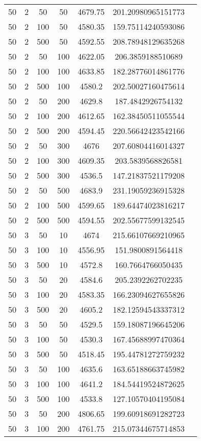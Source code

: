 {\begin{longtabu}{S
S
S
S
S
S[round-mode=places, round-precision=0]
S[round-mode=places, round-precision=0]}
50 & 2 & 50 & 50 & 4679.75 & 201.20980965151773 \\
50 & 2 & 100 & 50 & 4580.35 & 159.75114240593086 \\
50 & 2 & 500 & 50 & 4592.55 & 208.78948129635268 \\
50 & 2 & 50 & 100 & 4622.05 & 206.3859188510689 \\
50 & 2 & 100 & 100 & 4633.85 & 182.28776014861776 \\
50 & 2 & 500 & 100 & 4580.2 & 202.50027160475614 \\
50 & 2 & 50 & 200 & 4629.8 & 187.4842926754132 \\
50 & 2 & 100 & 200 & 4612.65 & 162.38450511055544 \\
50 & 2 & 500 & 200 & 4594.45 & 220.56642423542166 \\
50 & 2 & 50 & 300 & 4676 & 207.60804416014327 \\
50 & 2 & 100 & 300 & 4609.35 & 203.5839568826581 \\
50 & 2 & 500 & 300 & 4536.5 & 147.21837521179208 \\
50 & 2 & 50 & 500 & 4683.9 & 231.19059236915328 \\
50 & 2 & 100 & 500 & 4599.65 & 189.64474023816217 \\
50 & 2 & 500 & 500 & 4594.55 & 202.55677599132545 \\
50 & 3 & 50 & 10 & 4674 & 215.66107669210965 \\
50 & 3 & 100 & 10 & 4556.95 & 151.9800891564418 \\
50 & 3 & 500 & 10 & 4572.8 & 160.7664766050435 \\
50 & 3 & 50 & 20 & 4584.6 & 205.2392262702235 \\
50 & 3 & 100 & 20 & 4583.35 & 166.23094627655826 \\
50 & 3 & 500 & 20 & 4605.2 & 182.12594543337312 \\
50 & 3 & 50 & 50 & 4529.5 & 159.18087196645206 \\
50 & 3 & 100 & 50 & 4530.3 & 167.45688997470364 \\
50 & 3 & 500 & 50 & 4518.45 & 195.44781272759232 \\
50 & 3 & 50 & 100 & 4635.6 & 163.65188663745982 \\
50 & 3 & 100 & 100 & 4641.2 & 184.54419524872625 \\
50 & 3 & 500 & 100 & 4533.8 & 127.10570404195084 \\
50 & 3 & 50 & 200 & 4806.65 & 199.60918691282723 \\
50 & 3 & 100 & 200 & 4761.75 & 215.07344675714853 \\

\end{longtabu}}
